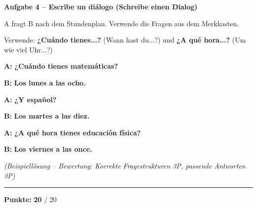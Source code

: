 \documentclass[11pt, a4paper]{article}
\newcommand{\fachfarbe}{spanisch}
\newcommand{\maxpunkte}{20}
\newcommand{\punktebox}[1]{\hfill\fbox{\small \_/#1}}
\newcommand{\lsg}[1]{\textcolor{loesung}{\textbf{#1}}}
\newenvironment{aufgabe}[1]{%
    \needspace{5\baselineskip}%
    \nopagebreak[4]%
    \vspace{10pt}
    \noindent\textbf{\textcolor{\fachfarbe}{Aufgabe #1}}
    \nopagebreak[4]%
    \vspace{5pt}
    \nopagebreak[4]%
    \begin{list}{}{\leftmargin=0pt}
    \item[]
}{%
    \end{list}
}
\newcommand{\es}[1]{\textcolor{\fachfarbe}{\textbf{#1}}}
\begin{document}
\begin{aufgabe}{4 -- Escribe un diálogo (Schreibe einen Dialog)}
A fragt B nach dem Stundenplan. Verwende die Fragen aus dem Merkkasten. \punktebox{6}
\end{aufgabe}

\begin{hinweis}
Verwende: \es{¿Cuándo tienes...?} (Wann hast du...?) und \es{¿A qué hora...?} (Um wie viel Uhr...?)
\end{hinweis}

\vspace{0.5em}

\noindent
\textbf{A:} \lsg{¿Cuándo tienes matemáticas?}

\vspace{1em}

\noindent
\textbf{B:} \lsg{Los lunes a las ocho.}

\vspace{1em}

\noindent
\textbf{A:} \lsg{¿Y español?}

\vspace{1em}

\noindent
\textbf{B:} \lsg{Los martes a las diez.}

\vspace{1em}

\noindent
\textbf{A:} \lsg{¿A qué hora tienes educación física?}

\vspace{1em}

\noindent
\textbf{B:} \lsg{Los viernes a las once.}

\textit{(Beispiellösung -- Bewertung: Korrekte Fragestrukturen 3P, passende Antworten 3P)}


\vspace{20pt}
\hrule
\vspace{10pt}

\begin{flushright}
\textbf{Punkte:} \lsg{\maxpunkte} / \maxpunkte
\end{flushright}
\end{document}
